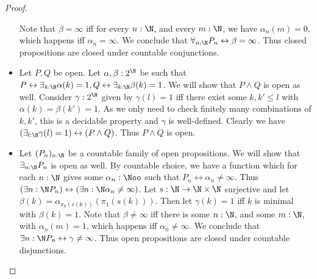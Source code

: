 \begin{proof}
\begin{itemize}
      Note that $\beta = \infty$ iff for every $n:\N$, 
      and every $m:\N$, we have $\alpha_n(m) = 0$, 
      which happens iff $\alpha_n = \infty$. 
      We conclude that $\forall_{n:\N} P_n \leftrightarrow \beta = \infty$.
      Thus closed propositions are closed under countable conjunctions. 
    \item 
      Let $P,Q$ be open. Let $\alpha,\beta:2^\N$ be such that 
      $
      P\leftrightarrow \exists_{k:\N}  \alpha(k) = 1, 
      Q\leftrightarrow \exists_{k:\N}  \beta(k) = 1
      $. 
      We will show that $P\wedge Q$ is open as well. 
      Consider $\gamma:2^\N$ given by 
      $\gamma(l) = 1$ iff there exist some $k,k'\leq l$ with 
      $\alpha(k) = \beta(k') = 1$. As we only need to check finitely many combinations 
      of $k,k'$, this is a decidable property and $\gamma$ is well-defined. 
      Clearly we have $(\exists_{l:\N} \gamma(l) = 1) \leftrightarrow (P \wedge Q)$. 
      Thus $P\wedge Q$ is open. 
    \item Let $(P_n)_{n:\N}$ be a countable family of open propositions. 
      We will show that $\exists_{n:\N}P_n$ is open as well. 
      By countable choice, we have a function which for each 
      $n:\N$ gives some $\alpha_n:\Noo$ 
      such that $P_n \leftrightarrow \alpha_n \neq \infty$. 
      Thus $(\exists{n:\N} P_n) \leftrightarrow 
      (\exists{n:\N}\alpha_n \neq \infty)$. 
      Let $s:\N \to \N \times \N$ surjective and let 
      $\beta(k) = \alpha_{\pi_0(s(k))}(\pi_1 (s(k)))$. 
      Then let $\gamma(k) = 1$ iff $k$ is minimal with $\beta(k) = 1$. 
      Note that $\beta \neq \infty$ iff there is some $n:\N$, 
      and some $m:\N$, with $\alpha_n(m) = 1$, 
      which happens iff $\alpha_n \neq \infty$. 
      We conclude that $\exists{n:\N} P_n \leftrightarrow \gamma \neq \infty$.
      Thus open propositions are closed under countable disjunctions. 
  \end{itemize}   
\end{proof}


